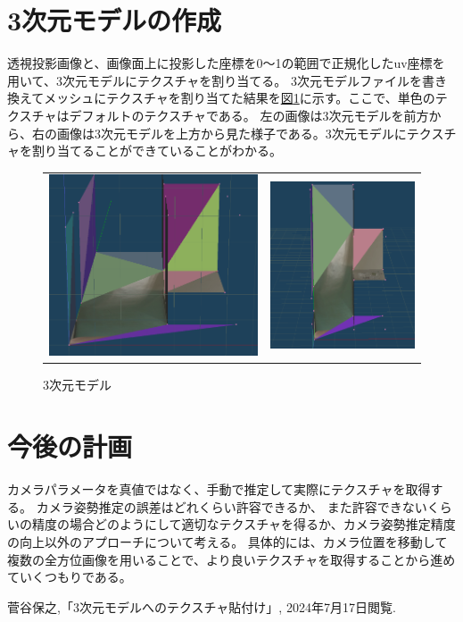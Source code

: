 \documentclass[]{jarticle}          %
\begin{document}
\section{3次元モデルの作成}
透視投影画像と、画像面上に投影した座標を0～1の範囲で正規化したuv座標を用いて、3次元モデルにテクスチャを割り当てる。
3次元モデルファイルを書き換えてメッシュにテクスチャを割り当てた結果を\hyperref[four]{図\ref{four}}に示す。ここで、単色のテクスチャはデフォルトのテクスチャである。
左の画像は3次元モデルを前方から、右の画像は3次元モデルを上方から見た様子である。3次元モデルにテクスチャを割り当てることができていることがわかる。
\begin{figure}[!ht]
  \begin{center}
    \begin{tabular}{cc}
      \includegraphics[keepaspectratio, width=0.4\linewidth]{figures/3dmodel0.png}&
      \includegraphics[keepaspectratio, width=0.4\linewidth]{figures/3dmodel1.png}\\
    \end{tabular}
  \end{center}
  \caption{3次元モデル}
  \label{four}
\end{figure}

\section{今後の計画}
カメラパラメータを真値ではなく、手動で推定して実際にテクスチャを取得する。
カメラ姿勢推定の誤差はどれくらい許容できるか、
また許容できないくらいの精度の場合どのようにして適切なテクスチャを得るか、カメラ姿勢推定精度の向上以外のアプローチについて考える。
具体的には、カメラ位置を移動して複数の全方位画像を用いることで、より良いテクスチャを取得することから進めていくつもりである。
\begin{thebibliography}{99}
 菅谷保之,「3次元モデルへのテクスチャ貼付け」, 2024年7月17日閲覧.
\end{thebibliography}
\end{document}
